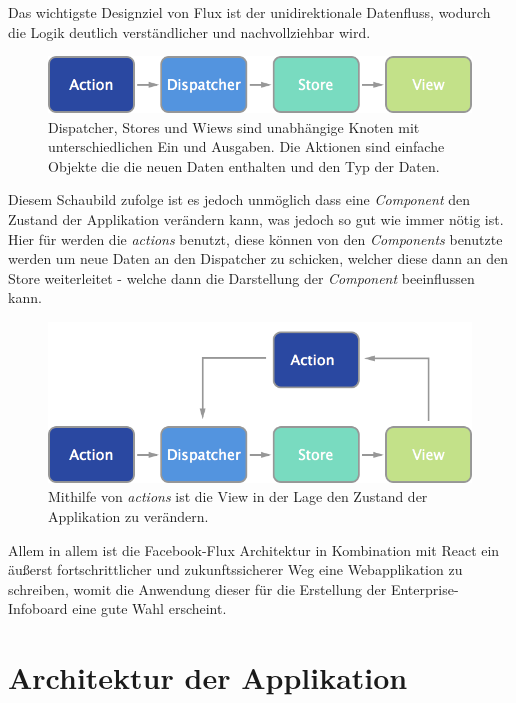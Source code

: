 \documentclass[12pt,twoside]{book}
\begin{document}
Das wichtigste Designziel von Flux ist der unidirektionale Datenfluss, wodurch die Logik deutlich verständlicher und nachvollziehbar wird.

\begin{figure}[H]
    \centering
    \includegraphics[width=1.0\textwidth]{images/flux.png}
    \caption{Dispatcher, Stores und Wiews sind unabhängige Knoten mit unterschiedlichen Ein und Ausgaben. Die Aktionen sind einfache Objekte die die neuen Daten enthalten und den Typ der Daten.}
    \label{fig:awesome_image}
\end{figure}

Diesem Schaubild zufolge ist es jedoch unmöglich dass eine \textit{Component} den Zustand der Applikation verändern kann, was jedoch so gut wie immer nötig ist. Hier für werden die \textit{actions} benutzt, diese können von den \textit{Components} benutzte werden um neue Daten an den Dispatcher zu schicken, welcher diese dann an den Store weiterleitet - welche dann die Darstellung der \textit{Component} beeinflussen kann.

\begin{figure}[H]
    \centering
    \includegraphics[width=1.0\textwidth]{images/flux_actions.png}
    \caption{Mithilfe von \textit{actions} ist die View in der Lage den Zustand der Applikation zu verändern.}
    \label{fig:awesome_image}
\end{figure}

Allem in allem ist die Facebook-Flux Architektur in Kombination mit React ein äußerst fortschrittlicher und zukunftssicherer Weg eine Webapplikation zu schreiben, womit die Anwendung dieser für die Erstellung der Enterprise-Infoboard eine gute Wahl erscheint.

\section{Architektur der Applikation}
\end{document}
